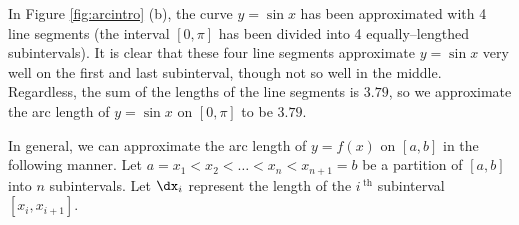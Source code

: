 In Figure \ref{fig:arcintro} (b), the curve $y=\sin x$ has been approximated with 4 line segments (the interval $[0,\pi]$ has been divided into 4 equally--lengthed subintervals). It is clear that these four line segments approximate $y=\sin x$ very well on the first and last subinterval, though not so well in the middle. Regardless, the sum of the lengths of the line segments is $3.79$, so we approximate the arc length of $y=\sin x$ on $[0,\pi]$ to be $3.79$. 


In general,  we can approximate the arc length of $y=f(x)$ on $[a,b]$ in the following manner. Let $a=x_1 < x_2 < \ldots < x_n< x_{n+1}=b$ be a partition of $[a,b]$ into $n$ subintervals. Let $\dx_i$ represent the length of the $i\,^\text{th}$ subinterval $[x_i,x_{i+1}]$.

